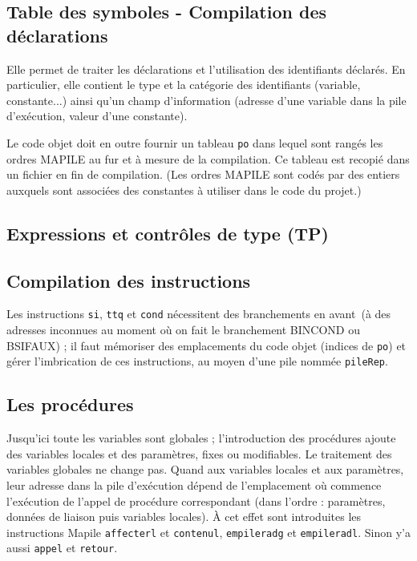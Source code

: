 \documentclass[a4paper]{article}
\begin{document}
\subsection{Table des symboles - Compilation des déclarations}

Elle permet de traiter les déclarations et l'utilisation des identifiants déclarés. En particulier, elle contient le type et la catégorie des identifiants (variable, constante...) ainsi qu'un champ d'information (adresse d'une variable dans la pile d'exécution, valeur d'une constante).

Le code objet doit en outre fournir un tableau \verb?po? dans lequel sont rangés les ordres MAPILE au fur et à mesure de la compilation. Ce tableau est recopié dans un fichier en fin de compilation. (Les ordres MAPILE sont codés par des entiers auxquels sont associées des constantes à utiliser dans le code du projet.)

\subsection{Expressions et contrôles de type (TP)}

\subsection{Compilation des instructions}

Les instructions \verb?si?, \verb?ttq? et \verb?cond? nécessitent des branchements \og en avant\fg\ (à des adresses inconnues au moment où on fait le branchement BINCOND ou BSIFAUX) ; il faut mémoriser des emplacements du code objet (indices de \verb?po?) et gérer l'imbrication de ces instructions, au moyen d'une pile nommée \verb?pileRep?.

\subsection{Les procédures}

Jusqu'ici toute les variables sont globales ; l'introduction des procédures ajoute des variables locales et des paramètres, fixes ou modifiables. Le traitement des variables globales ne change pas. Quand aux variables locales et aux paramètres, leur adresse dans la pile d'exécution dépend de l'emplacement où commence l'exécution de l'appel de procédure correspondant (dans l'ordre : paramètres, données de liaison puis variables locales). \`A cet effet sont introduites les instructions Mapile \verb?affecterl? et \verb?contenul?, \verb?empileradg? et \verb?empileradl?. Sinon y'a aussi \verb?appel? et \verb?retour?.
\end{document}

